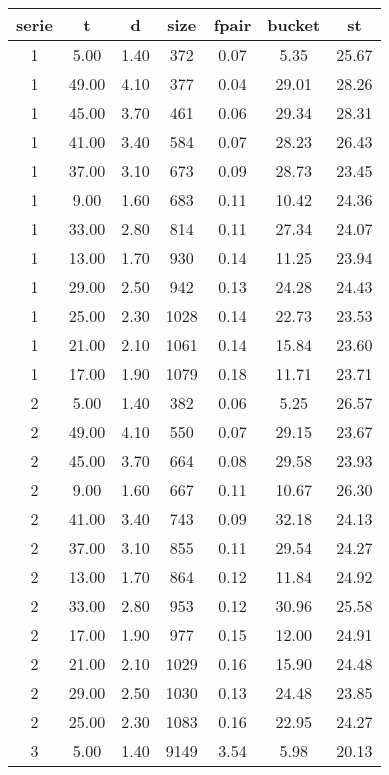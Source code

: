 \begin{tabular}{|c|c|c|c|c|c|c|}
\hline
\textbf{serie} & \textbf{t} & \textbf{d} & \textbf{size} & \textbf{fpair} & \textbf{bucket} & \textbf{st}\\
\hline
1 & 5.00 & 1.40 & 372 & 0.07 & 5.35 & 25.67\\
\hline
1 & 49.00 & 4.10 & 377 & 0.04 & 29.01 & 28.26\\
\hline
1 & 45.00 & 3.70 & 461 & 0.06 & 29.34 & 28.31\\
\hline
1 & 41.00 & 3.40 & 584 & 0.07 & 28.23 & 26.43\\
\hline
1 & 37.00 & 3.10 & 673 & 0.09 & 28.73 & 23.45\\
\hline
1 & 9.00 & 1.60 & 683 & 0.11 & 10.42 & 24.36\\
\hline
1 & 33.00 & 2.80 & 814 & 0.11 & 27.34 & 24.07\\
\hline
1 & 13.00 & 1.70 & 930 & 0.14 & 11.25 & 23.94\\
\hline
1 & 29.00 & 2.50 & 942 & 0.13 & 24.28 & 24.43\\
\hline
1 & 25.00 & 2.30 & 1028 & 0.14 & 22.73 & 23.53\\
\hline
1 & 21.00 & 2.10 & 1061 & 0.14 & 15.84 & 23.60\\
\hline
1 & 17.00 & 1.90 & 1079 & 0.18 & 11.71 & 23.71\\
\hline
2 & 5.00 & 1.40 & 382 & 0.06 & 5.25 & 26.57\\
\hline
2 & 49.00 & 4.10 & 550 & 0.07 & 29.15 & 23.67\\
\hline
2 & 45.00 & 3.70 & 664 & 0.08 & 29.58 & 23.93\\
\hline
2 & 9.00 & 1.60 & 667 & 0.11 & 10.67 & 26.30\\
\hline
2 & 41.00 & 3.40 & 743 & 0.09 & 32.18 & 24.13\\
\hline
2 & 37.00 & 3.10 & 855 & 0.11 & 29.54 & 24.27\\
\hline
2 & 13.00 & 1.70 & 864 & 0.12 & 11.84 & 24.92\\
\hline
2 & 33.00 & 2.80 & 953 & 0.12 & 30.96 & 25.58\\
\hline
2 & 17.00 & 1.90 & 977 & 0.15 & 12.00 & 24.91\\
\hline
2 & 21.00 & 2.10 & 1029 & 0.16 & 15.90 & 24.48\\
\hline
2 & 29.00 & 2.50 & 1030 & 0.13 & 24.48 & 23.85\\
\hline
2 & 25.00 & 2.30 & 1083 & 0.16 & 22.95 & 24.27\\
\hline
3 & 5.00 & 1.40 & 9149 & 3.54 & 5.98 & 20.13\\

\end{tabular}
